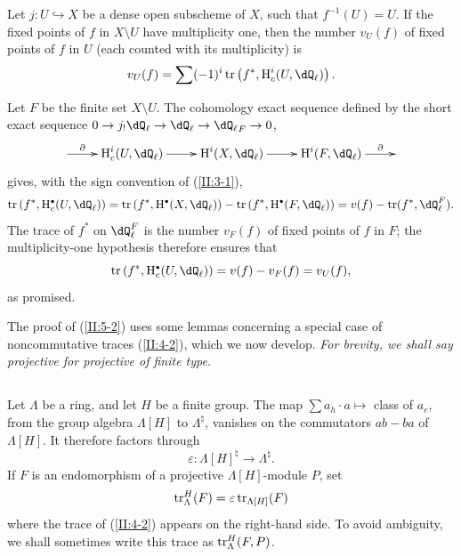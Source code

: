 \begin{corollary_}\label{II:5-4}
Let $j:U\hookrightarrow X$ be a dense open subscheme of $X$, such that
$f^{-1}(U)=U$. If the fixed points of $f$ in $X\setminus U$ have multiplicity
one, then the number $v_U(f)$ of fixed points of $f$ in $U$ (each counted
with its multiplicity) is
\[
  v_U(f) = \sum (-1)^i \tr\left(f^*,\h_c^i(U,\dQ_\ell)\right) \text{.}
\]
\end{corollary_}

Let $F$ be the finite set $X\setminus U$. The cohomology exact sequence
defined by the short exact sequence
$0\to j_! \dQ_\ell\to\dQ_\ell\to{\dQ_\ell}_F\to 0$,
\[\xymatrix{
  \ar[r]^-\partial
    & \h_c^i(U,\dQ_\ell) \ar[r]
    & \h^i(X,\dQ_\ell) \ar[r]
    & \h^i(F,\dQ_\ell) \ar[r]^-\partial
    &
}\]
gives, with the sign convention of (\ref{II:3-1}),
\[
  \tr\left(f^*,\h_c^\bullet(U,\dQ_\ell)\right)
    = \tr\left(f^*,\h^\bullet(X,\dQ_\ell)\right) - \tr\left(f^*,\h^\bullet(F,\dQ_\ell)\right)
    = v(f) - \tr(f^*,\dQ_\ell^F) \text{.}
\]
The trace of $f^*$ on $\dQ_\ell^F$ is the number $v_F(f)$ of fixed points of
$f$ in $F$; the multiplicity-one hypothesis therefore ensures that
\[
  \tr\left(f^*,\h_c^\bullet(U,\dQ_\ell)\right)
    = v(f) - v_F(f) = v_U(f) \text{,}
\]
as promised.

The proof of (\ref{II:5-2}) uses some lemmas concerning a special case of
noncommutative traces (\ref{II:4-2}), which we now develop. \emph{For
brevity, we shall say projective for projective of finite type}.






\subsection{}\label{II:5-5}

Let $\Lambda$ be a ring, and let $H$ be a finite group. The map
$\sum a_h \cdot a\mapsto $ class of $a_e$, from the group algebra
$\Lambda[H]$ to $\Lambda^\natural$, vanishes on the commutators $ab-ba$ of
$\Lambda[H]$. It therefore factors through
\[
  \varepsilon : \Lambda[H]^\natural \to \Lambda^\natural \text{.}
\]
If $F$ is an endomorphism of a projective $\Lambda[H]$-module $P$, set
\[
  \operatorname{tr}_\Lambda^H(F) = \varepsilon \operatorname{tr}_{\Lambda[H]} (F)
\]
where the trace of (\ref{II:4-2}) appears on the right-hand side. To avoid
ambiguity, we shall sometimes write this trace as $\operatorname{tr}_\Lambda^H(F,P)$.







